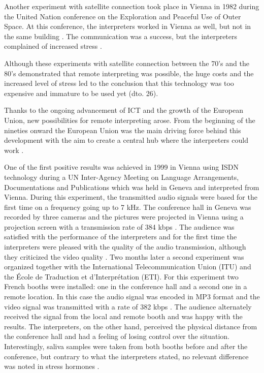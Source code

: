 \documentclass[output=paper]{langsci/langscibook}
\begin{document}
Another experiment with satellite connection took place in Vienna in 1982 during the United Nation conference on the Exploration and Peaceful Use of Outer Space. At this conference, the interpreters worked in Vienna as well, but not in the same building \citep[10]{Andres2009}. The communication was a success, but the interpreters complained of increased stress \citep[26]{UNESCO1987}.

Although these experiments with satellite connection between the 70’s and the 80’s demonstrated that remote interpreting was possible, the huge costs and the increased level of stress led to the conclusion that this technology was too expensive and immature to be used yet (dto. 26).

Thanks to the ongoing advancement of \textsc{ICT} and the growth of the European Union, new possibilities for remote interpreting arose. From the beginning of the nineties onward the European Union was the main driving force behind this development with the aim to create a central hub where the interpreters could work \citep[3]{Braun2011b}.

One of the first positive results was achieved in 1999 in Vienna using \textsc{ISDN} technology during a \textsc{UN} Inter-Agency Meeting on Language Arrangements, Documentations and Publications which was held in Geneva and interpreted from Vienna. During this experiment, the transmitted audio signals were based for the first time on a frequency going up to 7 kHz. The conference hall in Geneva was recorded by three cameras and the pictures were projected in Vienna using a projection screen with a transmission rate of 384 kbps \citep[63]{Mouzourakis2006}. The audience was satisfied with the performance of the interpreters and for the first time the interpreters were pleased with the quality of the audio transmission, although they criticized the video quality \citep[11]{Andres2009}. Two months later a second experiment was organized together with the International Telecommunication Union (\textsc{ITU}) and the École de Traduction et d’Interprétation (\textsc{ETI}). For this experiment two French booths were installed: one in the conference hall and a second one in a remote location. In this case the audio signal was encoded in MP3 format and the video signal was transmitted with a rate of 382 kbps \citep[63]{Mouzourakis2006}. The audience alternately received the signal from the local and remote booth and was happy with the results. The interpreters, on the other hand, perceived the physical distance from the conference hall and had a feeling of losing control over the situation. Interestingly, saliva samples were taken from both booths before and after the conference, but contrary to what the interpreters stated, no relevant difference was noted in stress hormones \citep{Moser-Mercer2003}.
\end{document}

